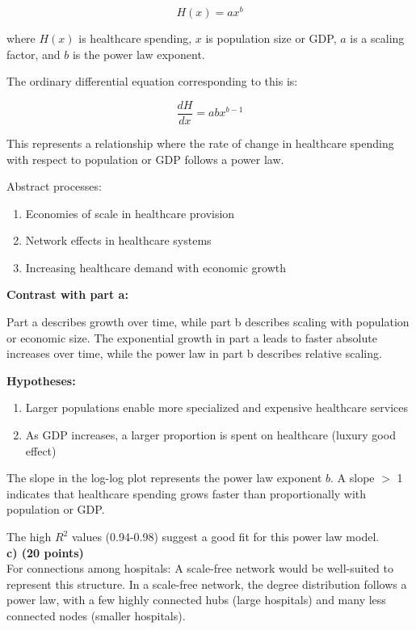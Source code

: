 \documentclass{article}
\begin{document}
$$H(x) = ax^b$$

where $H(x)$ is healthcare spending, $x$ is population size or GDP, $a$ is a scaling factor, and $b$ is the power law exponent.

The ordinary differential equation corresponding to this is:

$$\frac{dH}{dx} = abx^{b-1}$$

This represents a relationship where the rate of change in healthcare spending with respect to population or GDP follows a power law.

Abstract processes:
\begin{enumerate}
    \item Economies of scale in healthcare provision
    \item Network effects in healthcare systems
    \item Increasing healthcare demand with economic growth
\end{enumerate}

\textbf{Contrast with part a:}

Part a describes growth over time, while part b describes scaling with population or economic size. The exponential growth in part a leads to faster absolute increases over time, while the power law in part b describes relative scaling.

\textbf{Hypotheses:}

\begin{enumerate}
    \item Larger populations enable more specialized and expensive healthcare services
    \item As GDP increases, a larger proportion is spent on healthcare (luxury good effect)
\end{enumerate}

The slope in the log-log plot represents the power law exponent $b$. A slope $>$ 1 indicates that healthcare spending grows faster than proportionally with population or GDP.

The high $R^2$ values (0.94-0.98) suggest a good fit for this power law model.\\

\textbf{c) (20 points)}\\

For connections among hospitals:
A scale-free network would be well-suited to represent this structure. In a scale-free network, the degree distribution follows a power law, with a few highly connected hubs (large hospitals) and many less connected nodes (smaller hospitals).
\end{document}
